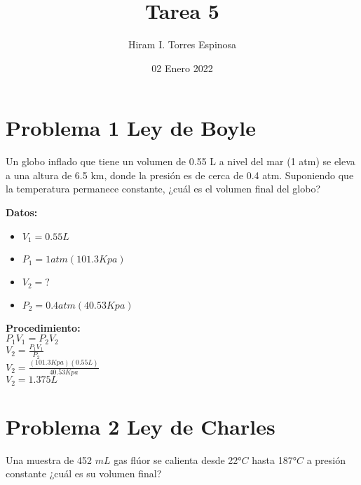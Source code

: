 \documentclass[12pt, letterpaper]{article}
\title{Tarea 5}
\author{Hiram I. Torres Espinosa}
\date{02 Enero 2022}
\begin{document}
    \begin{titlepage}
        \maketitle    
    \end{titlepage}
    

   

\section{Problema 1 Ley de Boyle}
Un globo inflado que tiene un volumen de 0.55 L a nivel del mar (1 atm) se eleva a una altura de
6.5 km, donde la presión es de cerca de 0.4 atm. Suponiendo que la temperatura permanece
constante, ¿cuál es el volumen final del globo?\\ 
\begin{multicols}{2}
\textbf{Datos:}

\begin{itemize}
    \item $V_1 = 0.55 L$
    \item $P_1 = 1 atm (101.3 Kpa)$ 
    \item $V_2 = ?$
    \item $P_2 = 0.4atm (40.53 Kpa)$
\end{itemize}


\textbf{Procedimiento:}\\

$P_1 V_1 = P_2 V_2$ \\ 

{\large$V_2 = \frac{P_1 V_1}{P_2}$}\\ 


{\large $V_2 = \frac{(101.3 Kpa) (0.55 L)}{40.53 Kpa}$
}\\

\ul{$V_2 = 1.375 L$}
\end{multicols}

\section{Problema 2 Ley de Charles}
Una muestra de 452 $mL$ gas flúor se calienta desde 22°$C$ hasta 187°$C$ a presión constante ¿cuál es
su volumen final? 
\end{document}
